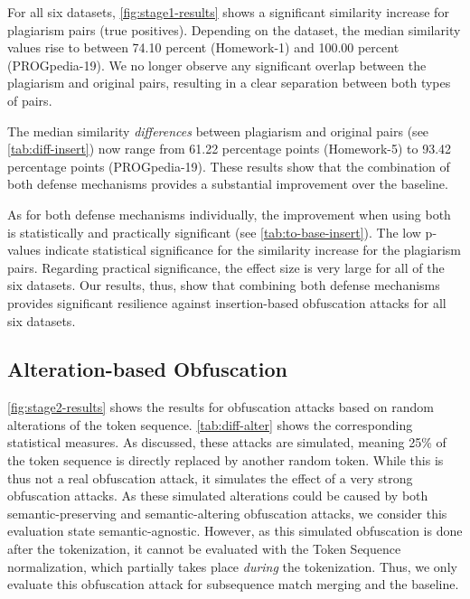 For all six datasets, \autoref{fig:stage1-results} shows a significant similarity increase for plagiarism pairs (true positives).
Depending on the dataset, the median similarity values rise to between 74.10 percent (Homework-1) and 100.00 percent (PROGpedia-19).
We no longer observe any significant overlap between the plagiarism and original pairs, resulting in a clear separation between both types of pairs.

The median similarity \textit{differences} between plagiarism and original pairs (see \autoref{tab:diff-insert}) now range from 61.22 percentage points (Homework-5) to 93.42  percentage points (PROGpedia-19).
These results show that the combination of both defense mechanisms provides a substantial improvement over the baseline. 

As for both defense mechanisms individually, the improvement when using both is statistically and practically significant (see \autoref{tab:to-base-insert}).
The low p-values indicate statistical significance for the similarity increase for the plagiarism pairs.
Regarding practical significance, the effect size is very large for all of the six datasets.
Our results, thus, show that combining both defense mechanisms provides significant resilience against insertion-based obfuscation attacks for all six datasets.


\subsection{Alteration-based Obfuscation}\label{sec:eval-alter}
\autoref{fig:stage2-results} shows the results for obfuscation attacks based on random alterations of the token sequence.
\autoref{tab:diff-alter} shows the corresponding statistical measures.
As discussed, these attacks are simulated, meaning 25\% of the token sequence is directly replaced by another random token. While this is thus not a real obfuscation attack, it simulates the effect of a very strong obfuscation attacks. As these simulated alterations could be caused by both semantic-preserving and semantic-altering obfuscation attacks, we consider this evaluation state semantic-agnostic. However, as this simulated obfuscation is done after the tokenization, it cannot be evaluated with the Token Sequence normalization, which partially takes place \textit{during} the tokenization.
Thus, we only evaluate this obfuscation attack for subsequence match merging and the baseline.

